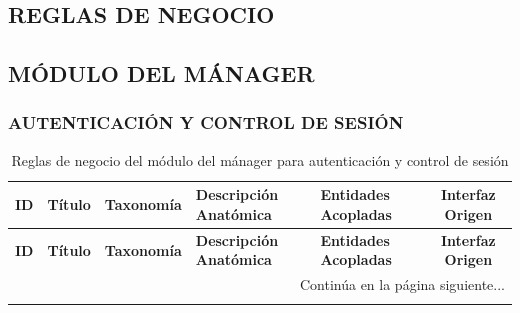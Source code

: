 \newpage
\begin{landscape}
\section{REGLAS DE NEGOCIO}
\subsection{MÓDULO DEL MÁNAGER}
\subsubsection{AUTENTICACIÓN Y CONTROL DE SESIÓN}

\begingroup
\setlength{\LTleft}{\fill}
\setlength{\LTright}{\fill}

\begin{longtable}[c]{l p{2.1cm} p{2.1cm} p{8cm} p{4cm} c}
\caption{Reglas de negocio del módulo del mánager para autenticación y control de sesión} \label{tab:reglas-negocio-manager-sesion} \\
\toprule
\textbf{ID} & \textbf{Título} & \textbf{Taxonomía} & \textbf{Descripción Anatómica} & \textbf{Entidades Acopladas} & \textbf{Interfaz Origen} \\
\midrule
\endfirsthead

\toprule
\textbf{ID} & \textbf{Título} & \textbf{Taxonomía} & \textbf{Descripción Anatómica} & \textbf{Entidades Acopladas} & \textbf{Interfaz Origen} \\
\midrule
\endhead

\midrule
\multicolumn{6}{r}{\small Continúa en la página siguiente...} \\
\endfoot
\bottomrule
\endlastfoot


\end{longtable}
\end{landscape}
